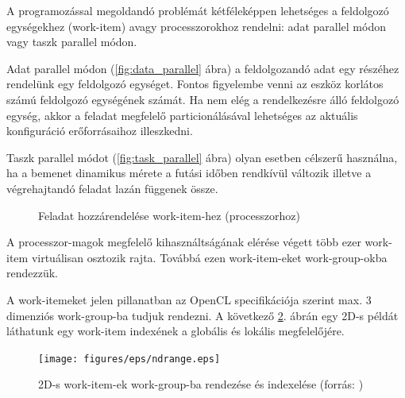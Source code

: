 	A programozással megoldandó problémát kétféleképpen lehetséges a feldolgozó
	egységekhez (work-item) avagy processzorokhoz rendelni:
	adat parallel módon vagy taszk parallel módon.
	
	Adat parallel módon (\ref{fig:data_parallel} ábra) a feldolgozandó adat egy
	részéhez rendelünk egy feldolgozó egységet. Fontos figyelembe venni az eszköz korlátos
	számú feldolgozó egységének számát. Ha nem elég a 
        rendelkezésre álló feldolgozó egység, akkor a
	feladat megfelelő particionálásával lehetséges az aktuális
        konfiguráció erőforrásaihoz illeszkedni.
	
	Taszk parallel módot (\ref{fig:task_parallel} ábra) olyan esetben célszerű
	használna, ha a bemenet dinamikus mérete a futási időben
        rendkívül változik
	illetve a végrehajtandó feladat lazán függenek össze.
	
	\begin{figure}[!ht]
		\centering
		\hfil
		\caption{Feladat hozzárendelése work-item-hez (processzorhoz)}
		\label{fig:parallel}
	\end{figure}
	A processzor-magok megfelelő kihasználtságának elérése végett több ezer
	work-item virtuálisan osztozik rajta.
	Továbbá ezen work-item-eket work-group-okba rendezzük.
	
	A work-itemeket jelen pillanatban az OpenCL specifikációja
        \cite{opencl} szerint max. 3 dimenziós
	work-group-ba tudjuk rendezni. A következő \ref{fig:ndrange}. ábrán egy 2D-s példát láthatunk egy work-item indexének a globális
	és lokális megfelelőjére.
	
	\begin{figure}[!h]
		\centering
		\texttt{[image: figures/eps/ndrange.eps]}
		\caption[2D-s work-item-ek work-group-ba rendezése és indexelése]{2D-s work-item-ek work-group-ba rendezése és indexelése
		(forrás: \cite{opencl})}
		\label{fig:ndrange} 
	\end{figure}

